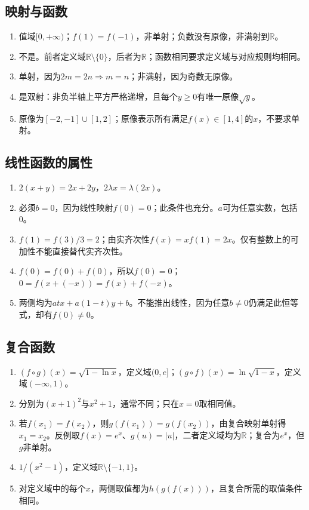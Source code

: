 \documentclass[11pt,a4paper,fontset=fandol]{ctexrep}
\begin{document}
\subsection{映射与函数}
\begin{enumerate}
\item 值域$[0,+\infty)$；$f(1)=f(-1)$，非单射；负数没有原像，非满射到$\mathbb R$。
\item 不是。前者定义域$\mathbb R\setminus\{0\}$，后者为$\mathbb R$；函数相同要求定义域与对应规则均相同。
\item 单射，因为$2m=2n\Rightarrow m=n$；非满射，因为奇数无原像。
\item 是双射：非负半轴上平方严格递增，且每个$y\ge0$有唯一原像$\sqrt y$。
\item 原像为$[-2,-1]\cup[1,2]$；原像表示所有满足$f(x)\in[1,4]$的$x$，不要求单射。
\end{enumerate}
\subsection{线性函数的属性}
\begin{enumerate}
\item $2(x+y)=2x+2y$，$2\lambda x=\lambda(2x)$。
\item 必须$b=0$，因为线性映射$f(0)=0$；此条件也充分。$a$可为任意实数，包括0。
\item $f(1)=f(3)/3=2$；由实齐次性$f(x)=xf(1)=2x$。仅有整数上的可加性不能直接替代实齐次性。
\item $f(0)=f(0)+f(0)$，所以$f(0)=0$；$0=f(x+(-x))=f(x)+f(-x)$。
\item 两侧均为$atx+a(1-t)y+b$。不能推出线性，因为任意$b\ne0$仍满足此恒等式，却有$f(0)\ne0$。
\end{enumerate}
\subsection{复合函数}
\begin{enumerate}
\item $(f\circ g)(x)=\sqrt{1-\ln x}$，定义域$(0,e]$；$(g\circ f)(x)=\ln\sqrt{1-x}$，定义域$(-\infty,1)$。
\item 分别为$(x+1)^2$与$x^2+1$，通常不同；只在$x=0$取相同值。
\item 若$f(x_1)=f(x_2)$，则$g(f(x_1))=g(f(x_2))$，由复合映射单射得$x_1=x_2$。反例取$f(x)=e^x$、$g(u)=|u|$，二者定义域均为$\mathbb R$；复合为$e^x$，但$g$非单射。
\item $1/(x^2-1)$，定义域$\mathbb R\setminus\{-1,1\}$。
\item 对定义域中的每个$x$，两侧取值都为$h(g(f(x)))$，且复合所需的取值条件相同。
\end{enumerate}
\end{document}
